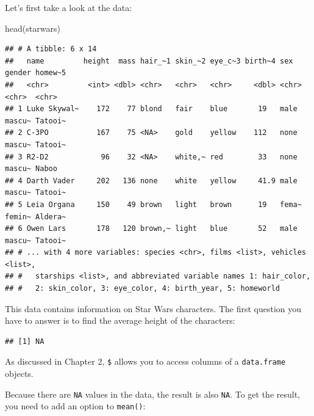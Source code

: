 \documentclass[
]{article}
\newenvironment{Shaded}{\begin{snugshade}}{\end{snugshade}}
\newcommand{\AttributeTok}[1]{\textcolor[rgb]{0.77,0.63,0.00}{#1}}
\newcommand{\ConstantTok}[1]{\textcolor[rgb]{0.00,0.00,0.00}{#1}}
\newcommand{\FunctionTok}[1]{\textcolor[rgb]{0.00,0.00,0.00}{#1}}
\newcommand{\NormalTok}[1]{#1}
\newcommand{\SpecialCharTok}[1]{\textcolor[rgb]{0.00,0.00,0.00}{#1}}
\begin{document}
Let's first take a look at the data:

\begin{Shaded}
\begin{Highlighting}[]
\FunctionTok{head}\NormalTok{(starwars)}
\end{Highlighting}
\end{Shaded}

\begin{verbatim}
## # A tibble: 6 x 14
##   name         height  mass hair_~1 skin_~2 eye_c~3 birth~4 sex   gender homew~5
##   <chr>         <int> <dbl> <chr>   <chr>   <chr>     <dbl> <chr> <chr>  <chr>  
## 1 Luke Skywal~    172    77 blond   fair    blue       19   male  mascu~ Tatooi~
## 2 C-3PO           167    75 <NA>    gold    yellow    112   none  mascu~ Tatooi~
## 3 R2-D2            96    32 <NA>    white,~ red        33   none  mascu~ Naboo  
## 4 Darth Vader     202   136 none    white   yellow     41.9 male  mascu~ Tatooi~
## 5 Leia Organa     150    49 brown   light   brown      19   fema~ femin~ Aldera~
## 6 Owen Lars       178   120 brown,~ light   blue       52   male  mascu~ Tatooi~
## # ... with 4 more variables: species <chr>, films <list>, vehicles <list>,
## #   starships <list>, and abbreviated variable names 1: hair_color,
## #   2: skin_color, 3: eye_color, 4: birth_year, 5: homeworld
\end{verbatim}

This data contains information on Star Wars characters. The first question you have to answer is
to find the average height of the characters:

\begin{Shaded}
\end{Shaded}

\begin{verbatim}
## [1] NA
\end{verbatim}

As discussed in Chapter 2, \texttt{\$} allows you to access columns of a \texttt{data.frame} objects.

Because there are \texttt{NA} values in the data, the result is also \texttt{NA}. To get the result, you need to
add an option to \texttt{mean()}:

\begin{Shaded}
\end{Shaded}
\end{document}
